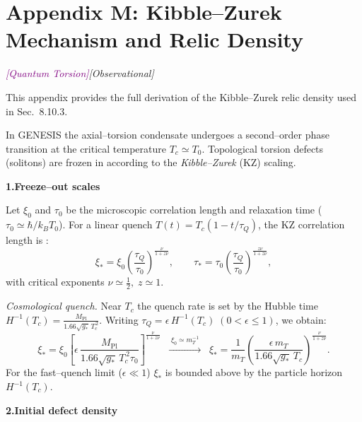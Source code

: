 \documentclass{article}
\newcommand{\quantumtag}{\textcolor{purple}{\textit{[Quantum Torsion]}}}
\newcommand{\obstag}{\textcolor{green!60!black}{\textit{[Observational]}}}
\begin{document}
\section*{Appendix M: Kibble--Zurek Mechanism and Relic Density}
\label{app:kibble-zurek}
\label{app:kibble-zurek}
\quantumtag   \obstag

\begin{tcolorbox}[colback=gray!5, colframe=black!30, title=Relation to main text]
This appendix provides the full derivation of the Kibble–Zurek relic density used in Sec.~8.10.3.
\end{tcolorbox}

In GENESIS the axial--torsion condensate undergoes a second--order phase
transition at the critical temperature \(T_c\simeq T_0\).
Topological torsion defects (solitons) are frozen in according to the
\emph{Kibble--Zurek} (KZ) scaling.

\vspace{0.6em}
\noindent\textbf{1.\;Freeze--out scales}

Let  
\(\xi_0\) and \(\tau_0\) be the microscopic correlation length
and relaxation time (\(\tau_0\simeq\hbar/k_{\!B}T_0\)).
For a linear quench \(T(t)=T_c(1-t/\tau_Q)\), the KZ correlation length is \cite{kibble1976,Żurek1985}:
\begin{equation}
\xi_*=\xi_0\!\left(\frac{\tau_Q}{\tau_0}\right)^{\!\frac{\nu}{1+z\nu}},
\qquad
\tau_*=\tau_0\!\left(\frac{\tau_Q}{\tau_0}\right)^{\!\frac{z\nu}{1+z\nu}},
\end{equation}
with critical exponents \(\nu\simeq\frac12,\;z\simeq1\).

\medskip
\noindent
\emph{Cosmological quench.}  
Near \(T_c\) the quench rate is set by the Hubble time
\(H^{-1}(T_c)=\frac{M_{\text{Pl}}}{1.66\sqrt{g_*}\,T_c^{\,2}}\).
Writing \(\tau_Q=\epsilon\,H^{-1}(T_c)\;(0<\epsilon\le1)\), we obtain:  
\begin{equation}
\xi_*=\xi_0\left[\epsilon\,
\frac{M_{\text{Pl}}}{1.66\sqrt{g_*}\,T_c^{\,2}\tau_0}\right]^{\!\frac{\nu}{1+z\nu}}
\;\; \xrightarrow{\;\xi_0\simeq m_T^{-1}\;}
\;\;\xi_*=\frac{1}{m_T}\!
\left(\frac{\epsilon\,m_T}{1.66\sqrt{g_*}\,T_c}\right)^{\!\frac{\nu}{1+z\nu}}\!.
\end{equation}
For the fast--quench limit (\(\epsilon\!\ll\!1\)) \(\xi_*\) is bounded above by the particle horizon
\(H^{-1}(T_c)\).

\vspace{0.6em}
\noindent\textbf{2.\;Initial defect density}
\end{document}
